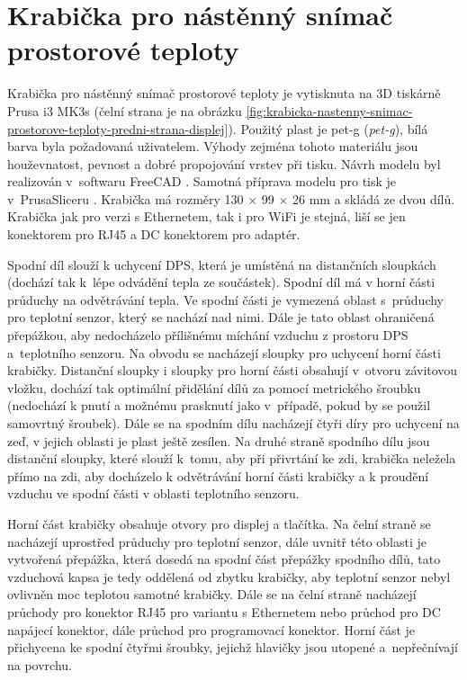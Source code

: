 \section{Krabička pro nástěnný snímač prostorové teploty}
\label{sec:krabicka-pro-nastenny-snimac-prostorove-teploty}
Krabička pro nástěnný snímač prostorové teploty je vytisknuta na 3D tiskárně Prusa i3 MK3s \cite{prusa-i3-mk3s+} (čelní strana je na obrázku \ref{fig:krabicka-nastenny-snimac-prostorove-teploty-predni-strana-displej}). Použitý plast je \acrshort{pet-g} \cite{prusament} (\textit{\acrlong{pet-g}}), bílá barva byla požadovaná uživatelem. Výhody zejména tohoto materiálu jsou houževnatost, pevnost a dobré propojování vrstev při tisku. Návrh modelu byl realizován v~softwaru FreeCAD \cite{freecad}. Samotná příprava modelu pro tisk je v~PrusaSliceru \cite{prusaslicer}. Krabička má rozměry 130 × 99 × 26 mm a skládá ze dvou dílů. Krabička jak pro verzi s Ethernetem, tak i pro WiFi je stejná, liší se jen konektorem pro RJ45 a DC konektorem pro adaptér.

Spodní díl slouží k uchycení DPS, která je umístěná na distančních sloupkách (dochází tak k~lépe odvádění tepla ze součástek). Spodní díl má v horní části průduchy na odvětrávání tepla. Ve spodní části je vymezená oblast s~průduchy pro teplotní senzor, který se nachází nad nimi. Dále je tato oblast ohraničená přepážkou, aby nedocházelo přílišnému míchání vzduchu z prostoru DPS a~teplotního senzoru. Na obvodu se nacházejí sloupky pro uchycení horní části krabičky. Distanční sloupky i sloupky pro horní části obsahují v~otvoru závitovou vložku, dochází tak optimální přidělání dílů za pomocí metrického šroubku (nedochází k pnutí a možnému prasknutí jako v~případě, pokud by se použil samovrtný šroubek). Dále se na spodním dílu nacházejí čtyři díry pro uchycení na zeď, v jejich oblasti je plast ještě zesílen. Na druhé straně spodního dílu jsou distanční sloupky, které slouží k~tomu, aby při přivrtání ke zdi, krabička neležela přímo na zdi, aby docházelo k odvětrávání horní části krabičky a k proudění vzduchu ve spodní části v oblasti teplotního senzoru.

Horní část krabičky obsahuje otvory pro displej a tlačítka. Na čelní straně se nacházejí uprostřed průduchy pro teplotní senzor, dále uvnitř této oblasti je vytvořená přepážka, která dosedá na spodní část přepážky spodního dílů, tato vzduchová kapsa je tedy oddělená od zbytku krabičky, aby teplotní senzor nebyl ovlivněn moc teplotou samotné krabičky. Dále se na čelní straně nacházejí průchody pro konektor RJ45 pro variantu s Ethernetem nebo průchod pro DC napájecí konektor, dále průchod pro programovací konektor. Horní část je přichycena ke spodní čtyřmi šroubky, jejichž hlavičky jsou utopené a~nepřečnívají na povrchu.

